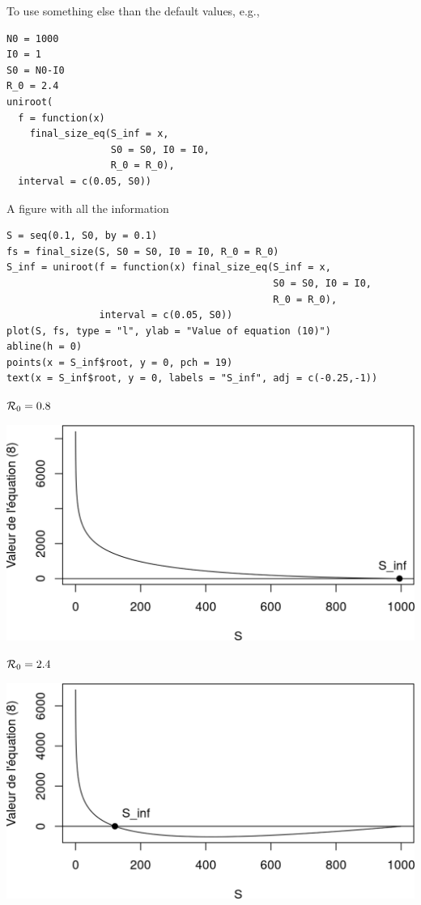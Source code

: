 \documentclass[aspectratio=43]{beamer}
\begin{document}
\begin{frame}[fragile]{}
To use something else than the default values, e.g.,
\vfill
\begin{lstlisting}  
N0 = 1000
I0 = 1
S0 = N0-I0
R_0 = 2.4
uniroot(
  f = function(x) 
    final_size_eq(S_inf = x, 
                  S0 = S0, I0 = I0, 
                  R_0 = R_0),
  interval = c(0.05, S0))
\end{lstlisting}
\end{frame}


\begin{frame}[fragile]{A figure with all the information}
\begin{lstlisting}
S = seq(0.1, S0, by = 0.1)
fs = final_size(S, S0 = S0, I0 = I0, R_0 = R_0)
S_inf = uniroot(f = function(x) final_size_eq(S_inf = x, 
                                              S0 = S0, I0 = I0, 
                                              R_0 = R_0),
                interval = c(0.05, S0))
plot(S, fs, type = "l", ylab = "Value of equation (10)")
abline(h = 0)
points(x = S_inf$root, y = 0, pch = 19)
text(x = S_inf$root, y = 0, labels = "S_inf", adj = c(-0.25,-1))    
\end{lstlisting}
\end{frame}


\begin{frame}{$\mathcal{R}_0=0.8$}
\begin{center}
  \includegraphics[width=\textwidth]{../FIGS/KMK_final_size_R0_0p8}
\end{center}
\end{frame}


\begin{frame}{$\mathcal{R}_0=2.4$}
  \begin{center}
    \includegraphics[width=\textwidth]{../FIGS/KMK_final_size_R0_2p4}
  \end{center}
\end{frame}
\end{document}
